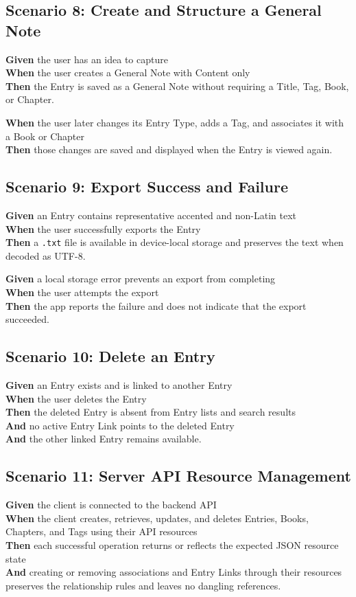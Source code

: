 \documentclass[11pt,a4paper]{article}
\begin{document}
\subsection*{Scenario 8: Create and Structure a General Note}
\textbf{Given} the user has an idea to capture\\
\textbf{When} the user creates a General Note with Content only\\
\textbf{Then} the Entry is saved as a General Note without requiring a Title, Tag, Book, or Chapter.

\textbf{When} the user later changes its Entry Type, adds a Tag, and associates it with a Book or Chapter\\
\textbf{Then} those changes are saved and displayed when the Entry is viewed again.

\subsection*{Scenario 9: Export Success and Failure}
\textbf{Given} an Entry contains representative accented and non-Latin text\\
\textbf{When} the user successfully exports the Entry\\
\textbf{Then} a \texttt{.txt} file is available in device-local storage and preserves the text when decoded as UTF-8.

\textbf{Given} a local storage error prevents an export from completing\\
\textbf{When} the user attempts the export\\
\textbf{Then} the app reports the failure and does not indicate that the export succeeded.

\subsection*{Scenario 10: Delete an Entry}
\textbf{Given} an Entry exists and is linked to another Entry\\
\textbf{When} the user deletes the Entry\\
\textbf{Then} the deleted Entry is absent from Entry lists and search results\\
\textbf{And} no active Entry Link points to the deleted Entry\\
\textbf{And} the other linked Entry remains available.

\subsection*{Scenario 11: Server API Resource Management}
\textbf{Given} the client is connected to the backend API\\
\textbf{When} the client creates, retrieves, updates, and deletes Entries, Books, Chapters, and Tags using their API resources\\
\textbf{Then} each successful operation returns or reflects the expected JSON resource state\\
\textbf{And} creating or removing associations and Entry Links through their resources preserves the relationship rules and leaves no dangling references.
\end{document}
